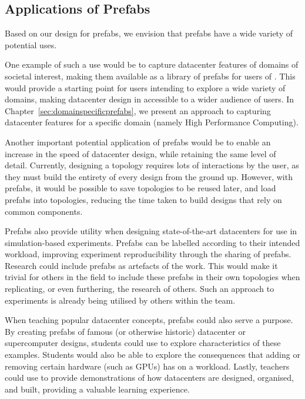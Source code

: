 \documentclass[11pt]{article}
\begin{document}
	\subsection{Applications of Prefabs}
		Based on our design for prefabs, we envision that prefabs have a wide variety of potential uses.

		One example of such a use would be to capture datacenter features of domains of societal interest, making them available as a library of prefabs for users of \opendc{}.
		This would provide a starting point for users intending to explore a wide variety of domains, making datacenter design in \opendc{} accessible to a wider audience of users.
		In Chapter~\ref{sec:domainspecificprefabs}, we present an approach to capturing datacenter features for a specific domain (namely High Performance Computing).

		Another important potential application of prefabs would be to enable an increase in the speed of datacenter design, while retaining the same level of detail.
		Currently, designing a topology requires lots of interactions by the user, as they must build the entirety of every design from the ground up.
		However, with prefabs, it would be possible to save topologies to be reused later, and load prefabs into topologies, reducing the time taken to build designs that rely on common components.

		Prefabs also provide utility when designing state-of-the-art datacenters for use in simulation-based experiments.
		Prefabs can be labelled according to their intended workload, improving experiment reproducibility through the sharing of prefabs.
		Research could include prefabs as artefacts of the work.
		This would make it trivial for others in the field to include these prefabs in their own topologies when replicating, or even furthering, the research of others. 
		Such an approach to experiments is already being utilised by others within the \opendc{} team.

		When teaching popular datacenter concepts, prefabs could also serve a purpose.
		By creating prefabs of famous (or otherwise historic) datacenter or supercomputer designs, students could use \opendc{} to explore characteristics of these examples.
		Students would also be able to explore the consequences that adding or removing certain hardware (such as GPUs) has on a workload.
		Lastly, teachers could use \opendc{} to provide demonstrations of how datacenters are designed, organised, and built, providing a valuable learning experience.
\end{document}
